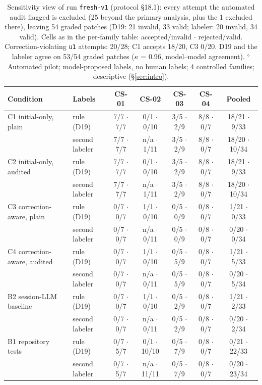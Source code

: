 \begin{table}[t]\centering\footnotesize
\caption{Sensitivity view of run \texttt{fresh-v1} (protocol \S18.1): every attempt the automated audit flagged is excluded (25 beyond the primary analysis, plus the 1 excluded there), leaving 54 graded patches (D19: 21 invalid, 33 valid; labeler: 20 invalid, 34 valid). Cells as in the per-family table: accepted/invalid $\cdot$ rejected/valid. Correction-violating \texttt{u1} attempts: 20/28; C1 accepts 18/20, C3 0/20. D19 and the labeler agree on 53/54 graded patches ($\kappa$ = 0.96, model--model agreement). $^{\diamond}$Automated pilot; model-proposed labels, no human labels; 4 controlled families; descriptive (\S\ref{sec:intro}).}\label{tab:fresh-sensitivity}
\begin{tabular}{llccccc}\toprule Condition & Labels & CS-01 & CS-02 & CS-03 & CS-04 & Pooled \\\midrule
C1 initial-only, plain & rule (D19) & 7/7 $\cdot$ 7/7 & 0/1 $\cdot$ 0/10 & 3/5 $\cdot$ 2/9 & 8/8 $\cdot$ 0/7 & 18/21 $\cdot$ 9/33 \\
 & second labeler & 7/7 $\cdot$ 7/7 & n/a $\cdot$ 1/11 & 3/5 $\cdot$ 2/9 & 8/8 $\cdot$ 0/7 & 18/20 $\cdot$ 10/34 \\\addlinespace
C2 initial-only, audited & rule (D19) & 7/7 $\cdot$ 7/7 & 0/1 $\cdot$ 0/10 & 3/5 $\cdot$ 2/9 & 8/8 $\cdot$ 0/7 & 18/21 $\cdot$ 9/33 \\
 & second labeler & 7/7 $\cdot$ 7/7 & n/a $\cdot$ 1/11 & 3/5 $\cdot$ 2/9 & 8/8 $\cdot$ 0/7 & 18/20 $\cdot$ 10/34 \\\addlinespace
C3 correction-aware, plain & rule (D19) & 0/7 $\cdot$ 0/7 & 1/1 $\cdot$ 0/10 & 0/5 $\cdot$ 0/9 & 0/8 $\cdot$ 0/7 & 1/21 $\cdot$ 0/33 \\
 & second labeler & 0/7 $\cdot$ 0/7 & n/a $\cdot$ 0/11 & 0/5 $\cdot$ 0/9 & 0/8 $\cdot$ 0/7 & 0/20 $\cdot$ 0/34 \\\addlinespace
C4 correction-aware, audited & rule (D19) & 0/7 $\cdot$ 0/7 & 1/1 $\cdot$ 0/10 & 0/5 $\cdot$ 5/9 & 0/8 $\cdot$ 0/7 & 1/21 $\cdot$ 5/33 \\
 & second labeler & 0/7 $\cdot$ 0/7 & n/a $\cdot$ 0/11 & 0/5 $\cdot$ 5/9 & 0/8 $\cdot$ 0/7 & 0/20 $\cdot$ 5/34 \\\addlinespace
B2 session-LLM baseline & rule (D19) & 0/7 $\cdot$ 0/7 & 1/1 $\cdot$ 0/10 & 0/5 $\cdot$ 2/9 & 0/8 $\cdot$ 0/7 & 1/21 $\cdot$ 2/33 \\
 & second labeler & 0/7 $\cdot$ 0/7 & n/a $\cdot$ 0/11 & 0/5 $\cdot$ 2/9 & 0/8 $\cdot$ 0/7 & 0/20 $\cdot$ 2/34 \\\addlinespace
B1 repository tests & rule (D19) & 0/7 $\cdot$ 5/7 & 0/1 $\cdot$ 10/10 & 0/5 $\cdot$ 7/9 & 0/8 $\cdot$ 0/7 & 0/21 $\cdot$ 22/33 \\
 & second labeler & 0/7 $\cdot$ 5/7 & n/a $\cdot$ 11/11 & 0/5 $\cdot$ 7/9 & 0/8 $\cdot$ 0/7 & 0/20 $\cdot$ 23/34 \\
\bottomrule\end{tabular}\end{table}
